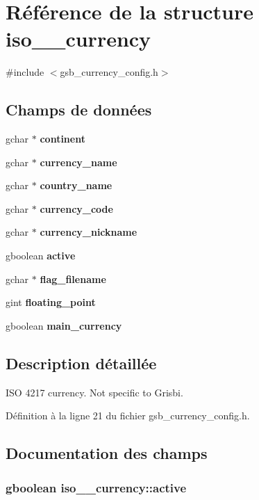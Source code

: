 \section{Référence de la structure iso\_\_\-currency}
\label{structiso__4217__currency}


{\ttfamily \#include $<$gsb\_\-currency\_\-config.h$>$}

\subsection*{Champs de données}
\begin{DoxyCompactItemize}
\item 
gchar $\ast$ {\bf continent}
\item 
gchar $\ast$ {\bf currency\_\-name}
\item 
gchar $\ast$ {\bf country\_\-name}
\item 
gchar $\ast$ {\bf currency\_\-code}
\item 
gchar $\ast$ {\bf currency\_\-nickname}
\item 
gboolean {\bf active}
\item 
gchar $\ast$ {\bf flag\_\-filename}
\item 
gint {\bf floating\_\-point}
\item 
gboolean {\bf main\_\-currency}
\end{DoxyCompactItemize}


\subsection{Description détaillée}
ISO 4217 currency. Not specific to Grisbi. 

Définition à la ligne 21 du fichier gsb\_\-currency\_\-config.h.



\subsection{Documentation des champs}
\subsubsection[{active}]{\setlength{\rightskip}{0pt plus 5cm}gboolean {\bf iso\_\_\-currency::active}}\label{structiso__4217__currency_a34e2e278d70f94b110869681e2c91c5e}


